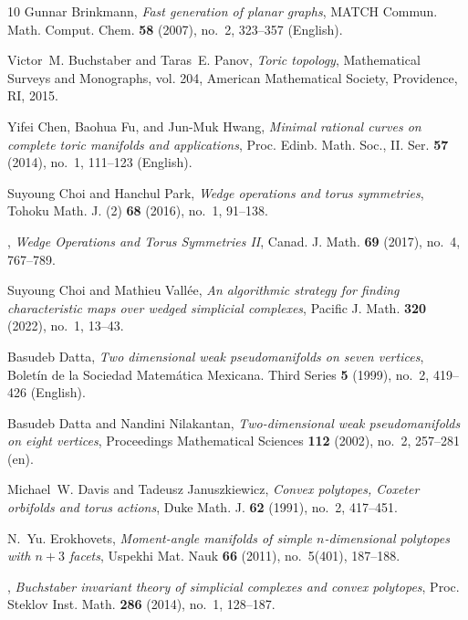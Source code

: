 \documentclass[11pt]{amsart}
\theoremstyle{plain}
\numberwithin{equation}{section}
\theoremstyle{definition}
\begin{document}
\begin{thebibliography}{10}
	Gunnar Brinkmann, \emph{Fast generation of planar graphs}, MATCH Commun. Math.
	Comput. Chem. \textbf{58} (2007), no.~2, 323--357 (English).
	
	Victor~M. Buchstaber and Taras~E. Panov, \emph{Toric topology}, Mathematical
	Surveys and Monographs, vol. 204, American Mathematical Society, Providence,
	RI, 2015. 
	
	Yifei Chen, Baohua Fu, and Jun-Muk Hwang, \emph{Minimal rational curves on
		complete toric manifolds and applications}, Proc. Edinb. Math. Soc., II. Ser.
	\textbf{57} (2014), no.~1, 111--123 (English).
	
	Suyoung Choi and Hanchul Park, \emph{Wedge operations and torus symmetries},
	Tohoku Math. J. (2) \textbf{68} (2016), no.~1, 91--138. 
	
	\bysame, \emph{Wedge {O}perations and {T}orus {S}ymmetries {II}}, Canad. J.
	Math. \textbf{69} (2017), no.~4, 767--789. 
	
	Suyoung Choi and Mathieu Vall\'{e}e, \emph{An algorithmic strategy for finding
		characteristic maps over wedged simplicial complexes}, Pacific J. Math.
	\textbf{320} (2022), no.~1, 13--43. 
	
	Basudeb Datta, \emph{Two dimensional weak pseudomanifolds on seven vertices},
	Boletín de la Sociedad Matemática Mexicana. Third Series \textbf{5} (1999),
	no.~2, 419–426 (English).
	
	Basudeb Datta and Nandini Nilakantan, \emph{Two-dimensional weak
		pseudomanifolds on eight vertices}, Proceedings Mathematical Sciences
	\textbf{112} (2002), no.~2, 257–281 (en).
	
	Michael~W. Davis and Tadeusz Januszkiewicz, \emph{Convex polytopes, {C}oxeter
		orbifolds and torus actions}, Duke Math. J. \textbf{62} (1991), no.~2,
	417--451. 
	
	N.~Yu. Erokhovets, \emph{Moment-angle manifolds of simple {$n$}-dimensional
		polytopes with {$n+3$} facets}, Uspekhi Mat. Nauk \textbf{66} (2011),
	no.~5(401), 187--188. 
	
	\bysame, \emph{Buchstaber invariant theory of simplicial complexes and convex
		polytopes}, Proc. Steklov Inst. Math. \textbf{286} (2014), no.~1, 128--187.
	

\end{thebibliography}
\end{document}
